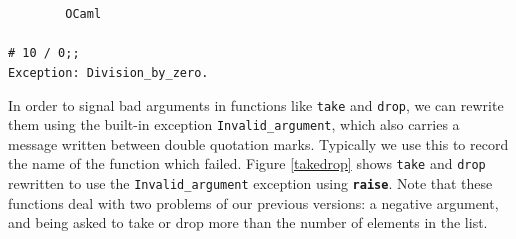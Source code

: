 \documentclass[]{book}
\newcommand{\smspace}{\vspace{4mm}}
\begin{document}
\smspace
\noindent\verb!        OCaml!\\
\noindent\\
\noindent\verb!# 10 / 0;;!\\
\noindent\verb!Exception: Division_by_zero.!
\smspace

\begin{sloppypar}
\noindent In order to signal bad arguments in functions like \texttt{take} and \texttt{drop}, we can rewrite them using the built-in exception \texttt{Invalid\_argument}, which also carries a message written between double quotation marks. Typically we use this to record the name of the function which failed. Figure \ref{takedrop} shows \texttt{take} and \texttt{drop} rewritten to use the \texttt{Invalid\_argument} exception using \texttt{\textbf{raise}}. Note that these functions deal with two problems of our previous versions: a negative argument, and being asked to take or drop more than the number of elements in the list.
\end{sloppypar}
\end{document}
